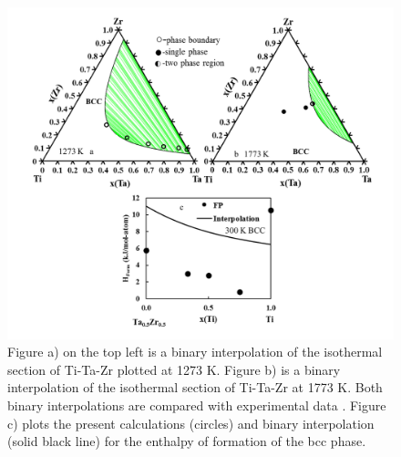 \newpage
\begin{figure}[H]
	\centering
	\includegraphics[width=\textwidth]{Chapter-3/Figures/TiTaZr1.png}
	\caption{Figure a) on the top left is a binary interpolation of the isothermal section of Ti-Ta-Zr plotted at 1273 K. Figure b) is a binary interpolation of the isothermal section of Ti-Ta-Zr at 1773 K. Both binary interpolations are compared with experimental data \cite{Lin1996,Hoch1964}. Figure c) plots the present calculations (circles) and binary interpolation (solid black line) for the enthalpy of formation of the bcc phase.}
	\label{Ch3-figure:TiTaZr}
\end{figure}
